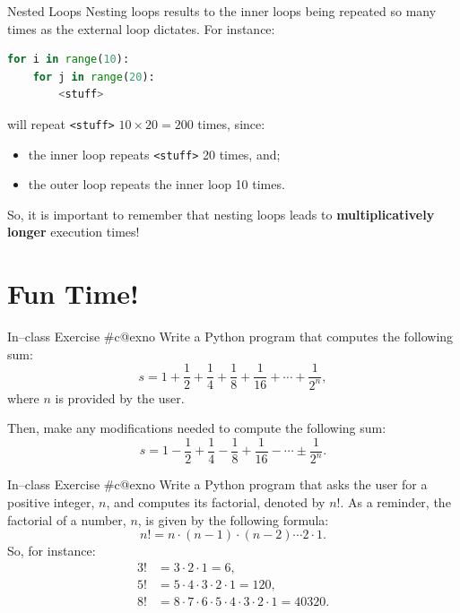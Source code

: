 \documentclass[aspectratio=169, 12pt, xcolor=table]{beamer}
\makeatletter
\newcommand{\arabicthree}[1]{\expandafter\@arabicthree\csname c@#1\endcsname}
\newcommand{\@arabicthree}[1]{\ifnum #1<100 0\fi\ifnum #1<10 0\fi\number#1}
\newcounter{exno}
\newcommand{\exno}{\stepcounter{exno}In--class Exercise \#\arabicthree{exno}}
\makeatother
\begin{document}
	\begin{frame}[fragile]{Nested Loops}
		Nesting loops results to the inner loops being repeated so many times as the external loop dictates. For instance:
		\begin{lstlisting}[language={Python}]
for i in range(10):
    for j in range(20):
        <stuff>
\end{lstlisting}
		will repeat \texttt{<stuff>} $10\times 20 = 200$ times, since:
		\begin{itemize}
			\item the inner loop repeats \texttt{<stuff>} 20 times, and;
			\item the outer loop repeats the inner loop 10 times.
		\end{itemize}
		So, it is important to remember that nesting loops leads to \textbf{multiplicatively longer} execution times!
	\end{frame}
	
	\section{Fun Time!}\label{sec:fun-time}
	
	\sectionframe
	
	\setcounter{exno}{0}
	
	\begin{frame}{\exno}
		Write a Python program that computes the following sum:
		\[s=1+\frac{1}{2}+\frac{1}{4}+\frac{1}{8}+\frac{1}{16}+\cdots+\frac{1}{2^n},\]
		where $n$ is provided by the user.
		
		Then, make any modifications needed to compute the following sum:
		\[s=1-\frac{1}{2}+\frac{1}{4}-\frac{1}{8}+\frac{1}{16}-\cdots\pm\frac{1}{2^n}.\]
	\end{frame}

	\begin{frame}{\exno}
		Write a Python program that asks the user for a positive integer, $n$, and computes its factorial, denoted by $n!$. As a reminder, the factorial of a number, $n$, is given by the following formula:
		\[n!=n\cdot(n-1)\cdot(n-2)\cdots 2\cdot 1.\]
		So, for instance:
		\begin{align*}
			3!&=3\cdot2\cdot1=6,\\
			5!&=5\cdot4\cdot3\cdot2\cdot1=120,\\
			8!&=8\cdot7\cdot6\cdot5\cdot4\cdot3\cdot2\cdot1=40320.
		\end{align*}
	\end{frame}
\end{document}
